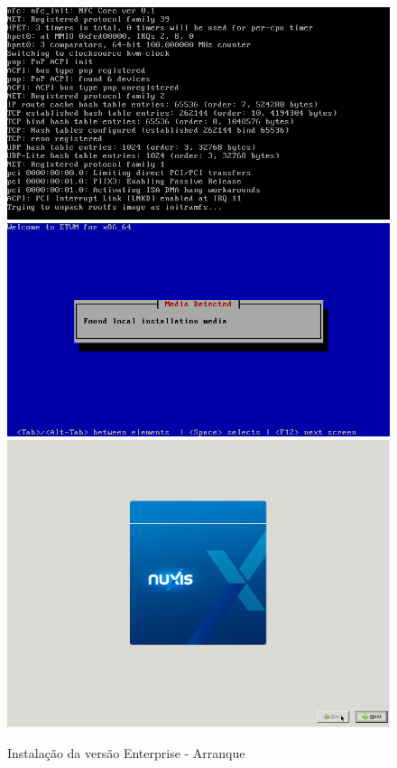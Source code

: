 \begin{figure}[H]
	\begin{center}
	\includegraphics[scale=0.3]{screenshots/install/nuxis/boot_installer.png}
	\includegraphics[scale=0.3]{screenshots/install/nuxis/load_installer_01.png}
	\includegraphics[scale=0.3]{screenshots/install/nuxis/wizard_install_01.png}
    \caption{Instalação da versão Enterprise - Arranque}
	\label{fig:installation_enterprise_01}
	\end{center}
\end{figure}
